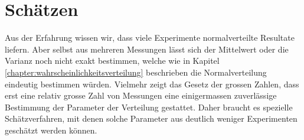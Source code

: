 %
%
%
\chapter{Schätzen} \label{chapter:schaetzen}
Aus der Erfahrung wissen wir, dass viele Experimente normalverteilte Resultate
liefern.
Aber selbst aus mehreren Messungen lässt sich der Mittelwert
oder die Varianz noch nicht exakt bestimmen,
welche wie in Kapitel \ref{chapter:wahrscheinlichkeitsverteilung}
beschrieben die Normalverteilung eindeutig bestimmen würden.
Vielmehr zeigt das Gesetz der grossen Zahlen, dass erst eine
relativ grosse Zahl von Messungen eine einigermassen zuverlässige
Bestimmung der Parameter der Verteilung gestattet.
Daher braucht es spezielle Schätzverfahren, mit denen solche Parameter
aus deutlich weniger Experimenten geschätzt werden können.










